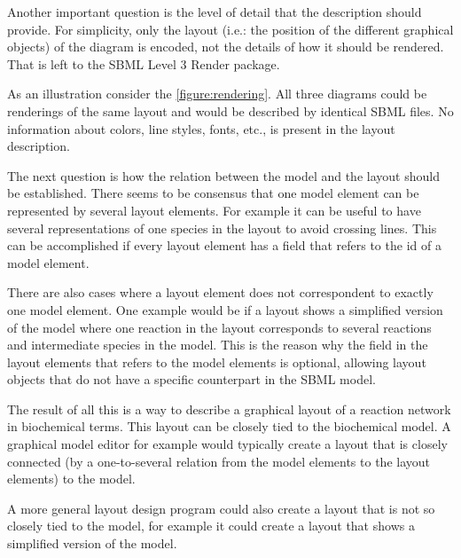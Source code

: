 Another important question is the level of detail that the description should provide. For simplicity, only the layout (i.e.: the position of the different graphical objects) of the diagram is encoded, not the details of how it should be rendered. That is left to the SBML Level 3 Render package. 

As an illustration consider the \ref{figure:rendering}. All three diagrams could be renderings of the same layout and would be described by identical SBML files. No information about colors, line styles, fonts, etc., is present in the layout description.

The next question is how the relation between the model and the layout should be established. There seems to be consensus that one model element can be represented by several layout elements. For example it can be useful to have several representations of one species in the layout to avoid crossing lines. This can be accomplished if every layout element has a field that refers to the id of a model element. 

There are also cases where a layout element does not correspondent to exactly one model element. One example would be if a layout shows a simplified version of the model where one reaction in
the layout corresponds to several reactions and intermediate species in the model. This is the reason why the field in the layout elements that refers to the model elements is optional, allowing layout objects that do not have a specific counterpart in the SBML model.

The result of all this is a way to describe a graphical layout of a reaction network in biochemical terms. This layout can be closely tied to the biochemical model. A graphical model editor for example would typically create a layout that is closely connected (by a one-to-several relation from the model elements to the layout elements) to the model. 

A more general layout design program could also create a layout that is not so closely tied to the model, for example it could create a layout that shows a simplified version of the model.

